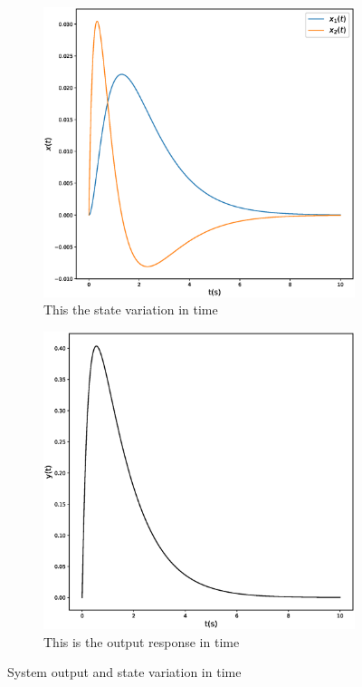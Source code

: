 \documentclass[a4paper,11pt]{article}
\begin{document}
\begin{figure}[ht]
\begin{subfigure}{.5\textwidth}
  \centering
  \includegraphics[width=.8\linewidth]{Figures/Question4/4stateplot.eps}  
  \caption{This the state variation in time} 
  \label{fig:sub-first}
\end{subfigure}
\begin{subfigure}{.5\textwidth}
  \centering
  \includegraphics[width=.8\linewidth]{Figures/Question4/4output.eps} 
\caption{This is the output response in time}  
	\label{fig:sub-second}
\end{subfigure}
\caption{System output and state variation in time}
\end{figure}
\end{document}
